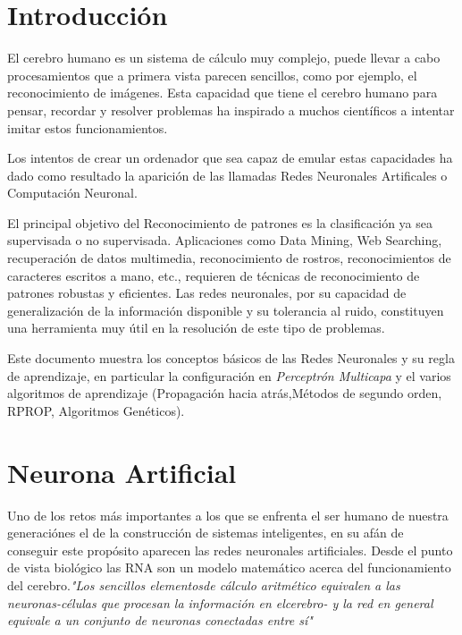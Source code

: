 \documentclass[12pt]{article}
\title{}
\begin{document}
\tableofcontents

\section{Introducción}

El cerebro humano es un sistema de cálculo muy complejo, puede llevar a cabo procesamientos que a primera vista parecen sencillos, como por ejemplo, el reconocimiento de imágenes. Esta capacidad que tiene el cerebro humano para pensar, recordar y resolver problemas ha inspirado a muchos científicos a intentar imitar estos funcionamientos.\hfill \break

Los intentos de crear un ordenador que sea capaz de emular estas capacidades ha dado como resultado la aparición de las llamadas Redes Neuronales Artificales o Computación Neuronal.\hfill \break

El principal objetivo del Reconocimiento de patrones es la clasificación ya sea supervisada o no supervisada. Aplicaciones como Data Mining, Web Searching, recuperación de datos multimedia, reconocimiento de rostros, reconocimientos de caracteres escritos a mano, etc., requieren de técnicas de reconocimiento de patrones robustas y eficientes.
Las redes neuronales, por su capacidad de generalización de la información disponible y su tolerancia al ruido, constituyen una herramienta muy útil en la resolución de este tipo de problemas.\cite{patterRecognition}\hfill \break

Este documento muestra los conceptos básicos de las Redes Neuronales y su regla de aprendizaje, en particular la configuración en \textit{Perceptrón Multicapa} y el varios algoritmos de aprendizaje (Propagación hacia atrás,Métodos de segundo orden, RPROP, Algoritmos Genéticos).


\clearpage

\section{Neurona Artificial}
Uno de los retos más importantes a los que se enfrenta el ser humano de nuestra generaciónes el de la construcción de sistemas inteligentes, en su afán de conseguir este propósito aparecen las redes neuronales artificiales. Desde el punto de vista biológico las RNA son un modelo matemático acerca del funcionamiento del cerebro.\textit{"Los sencillos elementosde cálculo aritmético equivalen a las neuronas-células que procesan la información en elcerebro- y la red en general equivale a un conjunto de neuronas conectadas entre sí"} \cite{IA}\hfill \break
\end{document}
